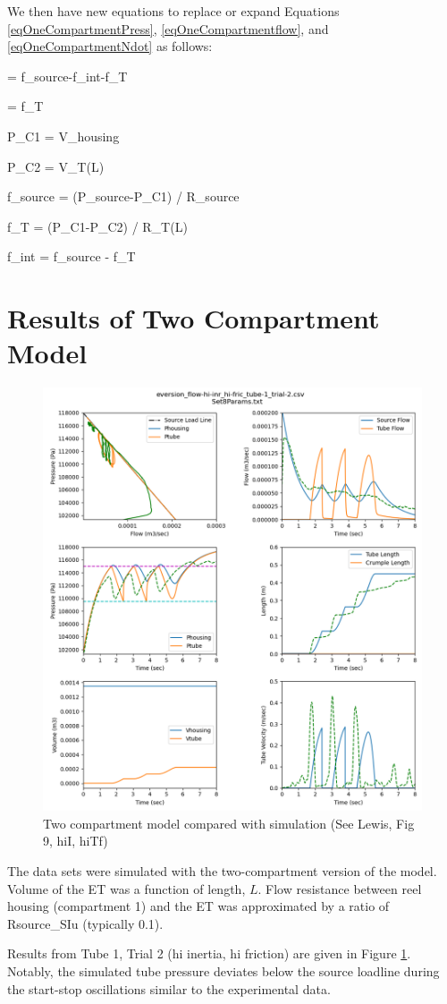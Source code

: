 \documentclass[letterpaper]{article}
\begin{document}
We then have new equations to replace or expand Equations \ref{eqOneCompartmentPress}, \ref{eqOneCompartmentflow}, and \ref{eqOneCompartmentNdot}
as follows:

\beq
{} = f_{source}-f_{int}-f_T
\eeq

\beq
{} =  f_T
\eeq

\beq
P_{C1} =   {V_{housing}}
\eeq

\beq
P_{C2} =   {V_T(L)}
\eeq

\beq
f_{source} = (P_{source}-P_{C1}) /  R_{source}
\eeq

\beq
f_{T} = (P_{C1}-P_{C2}) /  R_{T}(L)
\eeq

\beq
f_{int} = f_{source} - f_T
\eeq

\section{Results of Two Compartment Model}

\begin{figure}[h]\centering
\includegraphics[width=.75\textwidth]{2CompSimulationSet8.png}
\caption{Two compartment model compared with simulation (See Lewis, Fig 9, hiI, hiTf)}
\label{Fig:2Comp}
\end{figure}


The data sets were simulated with the two-compartment version of the model.  Volume of the ET was
a function of length, $L$.  Flow resistance between reel housing (compartment 1) and
the ET was approximated by a ratio of Rsource\_SIu (typically 0.1).

Results from Tube 1, Trial 2 (hi inertia, hi friction) are given in Figure \ref{Fig:2Comp}.
Notably, the simulated tube pressure deviates below the source loadline during the start-stop
oscillations similar to the experimental data.
%
\end{document}
